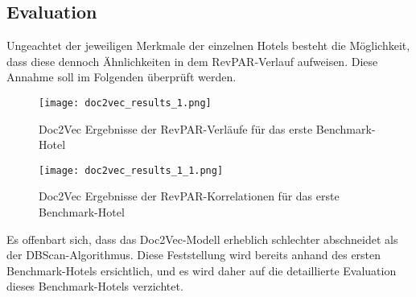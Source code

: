 \subsection{Evaluation}
Ungeachtet der jeweiligen Merkmale der einzelnen Hotels besteht die Möglichkeit, dass diese dennoch Ähnlichkeiten in dem RevPAR-Verlauf aufweisen. Diese Annahme soll im Folgenden überprüft werden.

\begin{figure}[h]
    \centering
    \texttt{[image: doc2vec\_results\_1.png]}
    \caption[Doc2Vec Ergebnisse der RevPAR-Verläufe für das erste Benchmark-Hotel]{Doc2Vec Ergebnisse der RevPAR-Verläufe für das erste Benchmark-Hotel}
    \label{img:doc2vec_results_1}
\end{figure}

\begin{figure}[h]
    \centering
    \texttt{[image: doc2vec\_results\_1\_1.png]}
    \caption[Doc2Vec Ergebnisse der RevPAR-Korrelationen für das erste Benchmark-Hotel]{Doc2Vec Ergebnisse der RevPAR-Korrelationen für das erste Benchmark-Hotel}
    \label{img:doc2vec_results_1_1}
\end{figure}

Es offenbart sich, dass das Doc2Vec-Modell erheblich schlechter abschneidet als der DBScan-Algorithmus. Diese Feststellung wird bereits anhand des ersten Benchmark-Hotels ersichtlich, und es wird daher auf die detaillierte Evaluation dieses Benchmark-Hotels verzichtet.